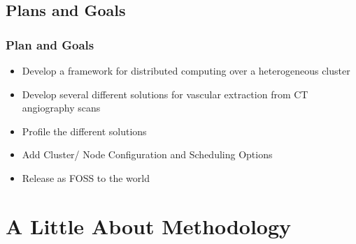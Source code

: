 \documentclass{beamer}
\begin{document}
\subsection{Plans and Goals}
\begin{frame}
\frametitle{Plan and Goals}
\begin{itemize}
\item{Develop a framework for distributed computing over a heterogeneous
cluster}
\item{Develop several different solutions for vascular extraction from CT
angiography scans}
\item{Profile the different solutions}
\item{Add Cluster/ Node Configuration and Scheduling Options}
\item{Release as FOSS to the world}
\end{itemize}
\end{frame}
\section{A Little About Methodology}
\end{document}
